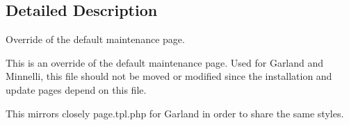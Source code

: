 \subsection{Detailed Description}
Override of the default maintenance page.

This is an override of the default maintenance page. Used for Garland and Minnelli, this file should not be moved or modified since the installation and update pages depend on this file.

This mirrors closely page.tpl.php for Garland in order to share the same styles. 